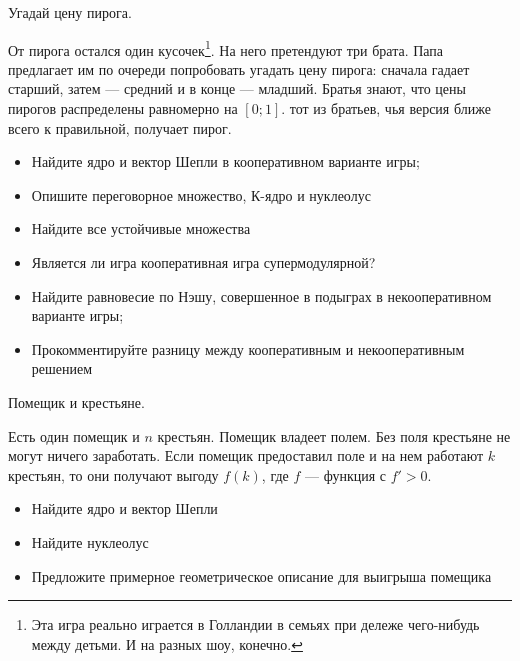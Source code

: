 \begin{problem}
Угадай цену пирога.


От пирога остался один кусочек\footnote{Эта игра реально играется в Голландии в семьях при дележе чего-нибудь между детьми. И на разных шоу, конечно.}. На него претендуют три брата. Папа предлагает им по очереди попробовать угадать цену пирога: сначала гадает старший, затем — средний и в конце — младший. Братья знают, что цены пирогов распределены равномерно на $[0;1]$. тот из братьев, чья версия ближе всего к правильной, получает пирог.
\begin{itemize}
\item Найдите ядро и вектор Шепли в кооперативном варианте игры;

\item Опишите переговорное множество, К-ядро и нуклеолус
\item Найдите все устойчивые множества


\item Является ли игра кооперативная игра супермодулярной?

\item Найдите равновесие по Нэшу, совершенное в подыграх в некооперативном варианте игры;

\item Прокомментируйте разницу между кооперативным и некооперативным решением
\end{itemize}



\begin{sol}

\end{sol}
\end{problem}




\begin{problem}
Помещик и крестьяне.

Есть один помещик и $n$ крестьян. Помещик владеет полем. Без поля крестьяне не могут ничего заработать. Если помещик предоставил поле и на нем работают $k$ крестьян, то они получают выгоду $f(k)$, где $f$ — функция с $f'>0$.
\begin{itemize}
\item Найдите ядро и вектор Шепли
\item Найдите нуклеолус
\item Предложите примерное геометрическое описание для выигрыша помещика
\end{itemize}



\begin{sol}

\end{sol}
\end{problem}




